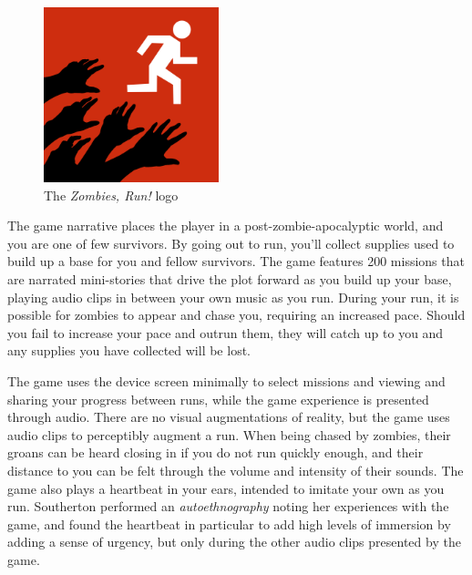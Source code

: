 \begin{figure}[h]
	\centering
	\includegraphics[height=2in]{Figures/zombies-run-logo}
	\caption{The \emph{Zombies, Run!} logo}
\end{figure}

The game narrative places the player in a post-zombie-apocalyptic world, and you are one of few survivors. By going out to run, you'll collect supplies used to build up a base for you and fellow survivors. The game features 200 missions that are narrated mini-stories that drive the plot forward as you build up your base, playing audio clips in between your own music as you run. During your run, it is possible for zombies to appear and chase you, requiring an increased pace. Should you fail to increase your pace and outrun them, they will catch up to you and any supplies you have collected will be lost.

The game uses the device screen minimally to select missions and viewing and sharing your progress between runs, while the game experience is presented through audio. There are no visual augmentations of reality, but the game uses audio clips to perceptibly augment a run. When being chased by zombies, their groans can be heard closing in if you do not run quickly enough, and their distance to you can be felt through the volume and intensity of their sounds. The game also plays a heartbeat in your ears, intended to imitate your own as you run. Southerton \cite{southerton2013zombies} performed an \emph{autoethnography} noting her experiences with the game, and found the heartbeat in particular to add high levels of immersion by adding a sense of urgency, but only during the other audio clips presented by the game.

